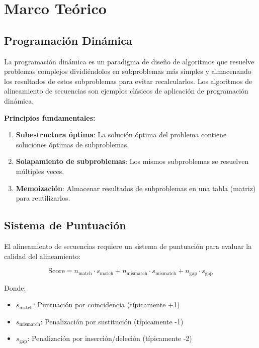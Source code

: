 \documentclass[12pt,a4paper]{article}
\begin{document}
\section{Marco Teórico}

\subsection{Programación Dinámica}

La programación dinámica es un paradigma de diseño de algoritmos que resuelve problemas complejos dividiéndolos en subproblemas más simples y almacenando los resultados de estos subproblemas para evitar recalcularlos. Los algoritmos de alineamiento de secuencias son ejemplos clásicos de aplicación de programación dinámica.

\textbf{Principios fundamentales:}

\begin{enumerate}
    \item \textbf{Subestructura óptima}: La solución óptima del problema contiene soluciones óptimas de subproblemas.
    \item \textbf{Solapamiento de subproblemas}: Los mismos subproblemas se resuelven múltiples veces.
    \item \textbf{Memoización}: Almacenar resultados de subproblemas en una tabla (matriz) para reutilizarlos.
\end{enumerate}

\subsection{Sistema de Puntuación}

El alineamiento de secuencias requiere un sistema de puntuación para evaluar la calidad del alineamiento:

\begin{equation}
\text{Score} = n_{\text{match}} \cdot s_{\text{match}} + n_{\text{mismatch}} \cdot s_{\text{mismatch}} + n_{\text{gap}} \cdot s_{\text{gap}}
\end{equation}

Donde:
\begin{itemize}
    \item $s_{\text{match}}$: Puntuación por coincidencia (típicamente +1)
    \item $s_{\text{mismatch}}$: Penalización por sustitución (típicamente -1)
    \item $s_{\text{gap}}$: Penalización por inserción/deleción (típicamente -2)
\end{itemize}
\end{document}
